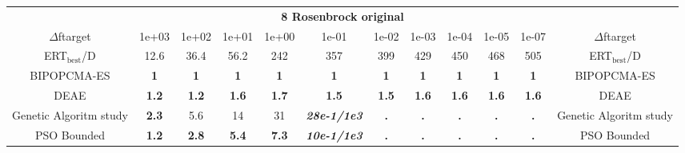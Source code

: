 \begin{tabular}{cccccccccccc}
 & \multicolumn{10}{c}{{\normalsize \textbf{8 Rosenbrock original}}}\\
$\Delta$ftarget& 1e+03& 1e+02& 1e+01& 1e+00& 1e-01& 1e-02& 1e-03& 1e-04& 1e-05& 1e-07 & $\Delta$ftarget \\
ERT$_{\textrm{best}}$/D& 12.6& 36.4& 56.2& 242& 357& 399& 429& 450& 468& 505 & ERT$_{\textrm{best}}$/D \\
\hline
BIPOPCMA-ES & \textbf{1} & \textbf{1} & \textbf{1} & \textbf{1} & \textbf{1} & \textbf{1} & \textbf{1} & \textbf{1} & \textbf{1} & \textbf{1} & BIPOPCMA-ES \cite{add_an_entry_for_BIPOPCMA-ES_in_bbob.bib}\\
DEAE & \textbf{1.2} & \textbf{1.2} & \textbf{1.6} & \textbf{1.7} & \textbf{1.5} & \textbf{1.5} & \textbf{1.6} & \textbf{1.6} & \textbf{1.6} & \textbf{1.6} & DEAE \cite{add_an_entry_for_DEAE_in_bbob.bib}\\
Genetic Algoritm study & \textbf{2.3} & 5.6 & 14 & 31 & \textbf{\textit{28e-1}\textit{/1e3}} & \textbf{.} & \textbf{.} & \textbf{.} & \textbf{.} & \textbf{.} & Genetic Algoritm study \cite{add_an_entry_for_Genetic Algoritm study_in_bbob.bib}\\
PSO Bounded & \textbf{1.2} & \textbf{2.8} & \textbf{5.4} & \textbf{7.3} & \textbf{\textit{10e-1}\textit{/1e3}} & \textbf{.} & \textbf{.} & \textbf{.} & \textbf{.} & \textbf{.} & PSO Bounded \cite{add_an_entry_for_PSO Bounded_in_bbob.bib}
\end{tabular}
